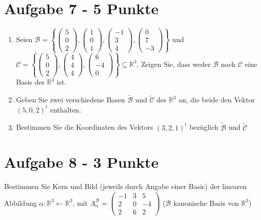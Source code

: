 \section*{Aufgabe 7 - 5 Punkte}
\begin{enumerate}[label=\alph*)]
\item Seien $\mathcal{B} = \left \lbrace
\begin{pmatrix} 5\\0\\2\end{pmatrix},
\begin{pmatrix} 1\\0\\1\end{pmatrix},
\begin{pmatrix} -1\\3\\4\end{pmatrix},
\begin{pmatrix} 0\\7\\-3\end{pmatrix}
\right \rbrace$ und $\mathcal{C}= \left \lbrace
\begin{pmatrix} 5\\0\\2\end{pmatrix},
\begin{pmatrix} 4\\4\\4\end{pmatrix},
\begin{pmatrix} 6\\-4\\0\end{pmatrix}
\right \rbrace \subseteq \mathbb{R}^3$. Zeigen Sie, dass weder $\mathcal{B}$ noch $\mathcal{C}$ eine Basis des $\mathbb{R}^3$ ist.
\item Geben Sie zwei verschiedene Basen  $\tilde{ \mathcal{B}}$ und  $\tilde{ \mathcal{C}}$ des $\mathbb{R}^3$ an, die beide den Vektor $(5,0,2)^t$ enthalten.
\item Bestimmen Sie die Koordinaten des Vektors $(3,2,1)^t$ bezüglich
 $\tilde{ \mathcal{B}}$ und  $\tilde{ \mathcal{C}}$
\end{enumerate}
\section*{Aufgabe 8 - 3 Punkte}
Bestimmen Sie Kern und Bild (jeweils durch Angabe einer Basis) der linearen Abbildung $\alpha : \mathbb{R}^3 \leftarrow \mathbb{R}^3$, mit
 $A_{\alpha}^{\mathcal{B}} = \begin{pmatrix} -1 &3&5\\2&0&-4\\2&6&2\end{pmatrix}$ ($\mathcal{B}$ kanonische Basis von $\mathbb{R}^3$)

